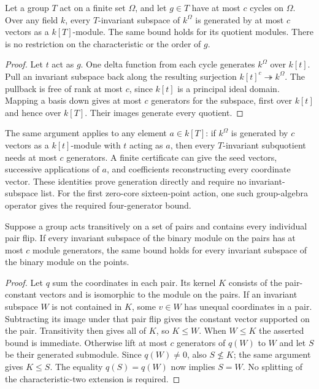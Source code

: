 \begin{lemma}\label{lem:point-orbit-generators}
Let a group $T$ act on a finite set $\Omega$, and let $g\in T$ have
at most $c$ cycles on $\Omega$. Over any field $k$, every
$T$-invariant subspace of $k^\Omega$ is generated by at most $c$
vectors as a $k[T]$-module. The same bound holds for its quotient
modules. There is no restriction on the characteristic or the order
of $g$.
\end{lemma}
\begin{proof}
Let $t$ act as $g$. One delta function from each cycle generates
$k^\Omega$ over $k[t]$. Pull an invariant subspace back along the
resulting surjection $k[t]^c\twoheadrightarrow k^\Omega$.
The pullback is free of rank at most $c$, since $k[t]$ is a principal
ideal domain. Mapping a basis down gives at most $c$ generators for
the subspace, first over $k[t]$ and hence over $k[T]$. Their images
generate every quotient.
\end{proof}

The same argument applies to any element $a\in k[T]$: if $k^\Omega$
is generated by $c$ vectors as a $k[t]$-module with $t$ acting as $a$,
then every $T$-invariant subquotient needs at most $c$ generators.
A finite certificate can give the seed vectors, successive applications
of $a$, and coefficients reconstructing every coordinate vector.
These identities prove generation directly and require no invariant-subspace
list. For the first zero-core sixteen-point action, one such group-algebra
operator gives the required four-generator bound.

\begin{lemma}
\label{lem:full-pair-kernel-sharing}
Suppose a group acts transitively on a set of pairs and contains every
individual pair flip. If every invariant subspace of the binary module
on the pairs has at most $c$ module generators, the same bound holds for
every invariant subspace of the binary module on the points.
\end{lemma}
\begin{proof}
Let $q$ sum the coordinates in each pair. Its kernel $K$ consists of
the pair-constant vectors and is isomorphic to the module on the pairs.
If an invariant subspace $W$ is not contained in $K$, some $v\in W$
has unequal coordinates in a pair. Subtracting its image under that
pair flip gives the constant vector supported on the pair. Transitivity
then gives all of $K$, so $K\leq W$.
When $W\leq K$ the asserted bound is immediate. Otherwise lift at most
$c$ generators of $q(W)$ to $W$ and let $S$ be their generated submodule.
Since $q(W)\ne0$, also $S\not\leq K$; the same argument gives $K\leq S$.
The equality $q(S)=q(W)$ now implies $S=W$. No splitting of the
characteristic-two extension is required.
\end{proof}

